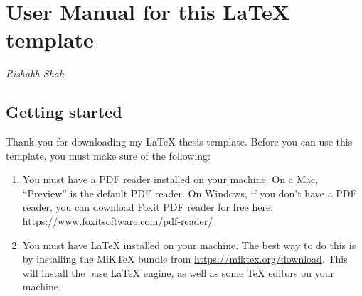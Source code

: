 \documentclass[12pt]{report} %
\begin{document}
\section*{User Manual for this \LaTeX{} template}
\textit{Rishabh Shah}
\subsection*{Getting started}
Thank you for downloading my \LaTeX{} thesis template. Before you can use this template, you must make sure of the following:
\begin{enumerate}
\item You must have a PDF reader installed on your machine. On a Mac, ``Preview'' is the default PDF reader. On Windows, if you don't have a PDF reader, you can download Foxit PDF reader for free here: \url{https://www.foxitsoftware.com/pdf-reader/}
\item You must have LaTeX installed on your machine. The best way to do this is by installing the MiKTeX bundle from \url{https://miktex.org/download}. This will install the base LaTeX engine, as well as some TeX editors on your machine.
\end{enumerate}
\end{document}
